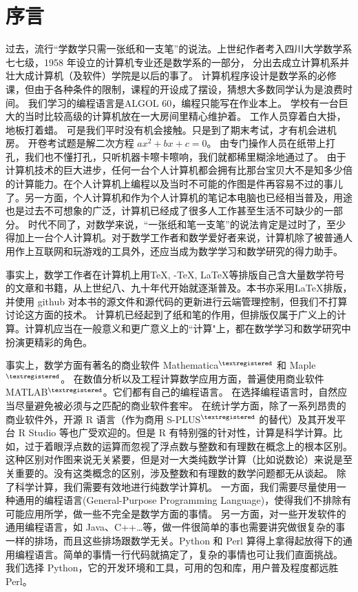 \documentclass[main.tex]{subfiles}
\begin{document}
\chapter*{序\quad 言}

\setcounter{page}{1}
\thispagestyle{empty}

过去，流行“学数学只需一张纸和一支笔”的说法。上世纪作者考入四川大学数学系七七级，1958 年设立的计算机专业还是数学系的一部分，
分出去成立计算机系并壮大成计算机（及软件）学院是以后的事了。
计算机程序设计是数学系的必修课，但由于各种条件的限制，课程的开设成了摆设，猜想大多数同学认为是浪费时间。
我们学习的编程语言是ALGOL 60，编程只能写在作业本上。
学校有一台巨大的当时比较高级的计算机放在一大房间里精心维护着。
工作人员穿着白大掛，地板打着蜡。
可是我们平时没有机会接触。只是到了期末考试，才有机会进机房。
开卷考试题是解二次方程 $ax^2+bx+c = 0$。
由专门操作人员在纸带上打孔，我们也不懂打孔，只听机器卡嚓卡嚓响，我们就都稀里糊涂地通过了。
由于计算机技术的巨大进步，任何一台个人计算机都会拥有比那台宝贝大不是知多少倍的计算能力。在个人计算机上编程以及当时不可能的作图是件再容易不过的事儿了。另一方面，个人计算机和作为个人计算机的笔记本电脑也已经相当普及，用途也是过去不可想象的广泛，计算机已经成了很多人工作甚至生活不可缺少的一部分。
时代不同了，对数学来说，“一张纸和笔一支笔”的说法肯定是过时了，至少得加上一台个人计算机。对于数学工作者和数学爱好者来说，计算机除了被普通人用作上互联网和玩游戏的工具外，还应当成为数学学习和数学研究的得力助手。

事实上，数学工作者在计算机上用\TeX, \AmS-\TeX, \LaTeX 等排版自己含大量数学符号的文章和书籍，从上世纪八、九十年代开始就逐渐普及。本书亦采用\LaTeX 排版， 并使用 github 对本书的源文件和源代码的更新进行云端管理控制，但我们不打算讨论这方面的技术。
计算机已经起到了纸和笔的作用，但排版仅属于广义上的计算。计算机应当在一般意义和更广意义上的“计算"上，都在数学学习和数学研究中扮演更精彩的角色。

事实上，数学方面有著名的商业软件 Mathematica${}^{\textregistered}$ 和 Maple${}^{\textregistered}$。
在数值分析以及工程计算数学应用方面，普遍使用商业软件 MATLAB${}^{\textregistered}$。它们都有自己的编程语言。
在选择编程语言时，自然应当尽量避免被必须与之匹配的商业软件套牢。
在统计学方面，除了一系列昂贵的商业软件外，开源 R 语言（作为商用 S-PLUS${}^{\textregistered}$ 的替代）及其开发平台 R Studio 等也广受欢迎的。但是 R 有特别强的针对性，计算是科学计算。比如，过于着眼浮点数的运算而忽视了浮点数与整数和有理数在概念上的根本区别。这种区别对作图来说无关紧要，但是对一大类纯数学计算（比如说数论）来说是至关重要的。没有这类概念的区别，涉及整数和有理数的数学问题都无从谈起。
除了科学计算，我们需要有效地进行纯数学计算机。
一方面，我们需要尽量使用一种通用的编程语言(General-Purpose Programming Language)，使得我们不排除有可能应用所学，做一些不完全是数学方面的事情。
另一方面，对一些开发软件的通用编程语言，如 Java、C++…等，做一件很简单的事也需要讲究做很复杂的事一样的排场，而且这些排场跟数学无关。Python 和 Perl 算得上拿得起放得下的通用编程语言。简单的事情一行代码就搞定了，复杂的事情也可让我们直面挑战。
我们选择 Python，它的开发环境和工具，可用的包和库，用户普及程度都远胜Perl。
\end{document}

